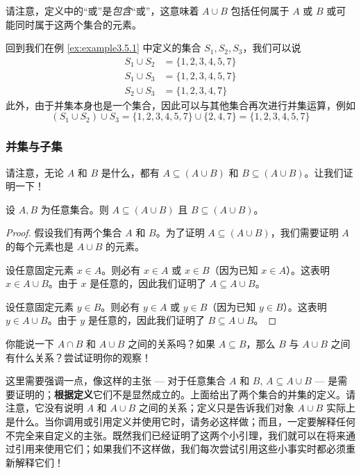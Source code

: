 请注意，定义中的``或''是\emph{包含}``或''，这意味着 $A \cup B$ 包括任何属于 $A$ 或 $B$ 或可能同时属于这两个集合的元素。\\

\begin{example}
    回到我们在例 \ref{ex:example3.5.1} 中定义的集合 $S_1, S_2, S_3$，我们可以说
    \begin{align*}
        S_1 \cup S_2 &= \{1, 2, 3, 4, 5, 7\} \\
        S_1 \cup S_3 &= \{1, 2, 3, 4, 5, 7\} \\
        S_2 \cup S_3 &= \{1, 2, 3, 4, 7\}
    \end{align*}
    此外，由于并集本身也是一个集合，因此可以与其他集合再次进行并集运算，例如
    \[(S_1 \cup S_2) \cup S_3 = \{1, 2, 3, 4, 5, 7\} \cup  \{2, 4, 7\} =  \{1, 2, 3, 4, 5, 7\}\]
\end{example}

\subsubsection*{并集与子集}

请注意，无论 $A$ 和 $B$ 是什么，都有 $A \subseteq (A \cup B)$ 和 $B \subseteq (A \cup B)$。让我们证明一下！

\begin{proposition}
    设 $A, B$ 为任意集合。则 $A \subseteq (A \cup B)$ 且 $B \subseteq (A \cup B)$。
\end{proposition}

\begin{proof}
    假设我们有两个集合 $A$ 和 $B$。为了证明 $A \subseteq (A \cup B)$，我们需要证明 $A$ 的每个元素也是 $A \cup B$ 的元素。

    设任意固定元素 $x \in A$。则必有 $x \in A$ 或 $x \in B$（因为已知 $x \in A$）。这表明 $x \in A \cup B$。由于 $x$ 是任意的，因此我们证明了 $A \subseteq A \cup B$。

    设任意固定元素 $y \in B$。则必有 $y \in A$ 或 $y \in B$（因为已知 $y \in B$）。这表明 $y \in A \cup B$。由于 $y$ 是任意的，因此我们证明了 $B \subseteq A \cup B$。
\end{proof}

你能说一下 $A \cap B$ 和 $A \cup B$ 之间的关系吗？如果 $A \subseteq B$，那么 $B$ 与 $A \cup B$ 之间有什么关系？尝试证明你的观察！

这里需要强调一点，像这样的主张 --- 对于任意集合 $A$ 和 $B$, $A \subseteq A \cup B$ --- 是需要证明的；\textbf{根据定义}它们不是显然成立的。上面给出了两个集合的并集的定义。请注意，它没有说明 $A$ 和 $A \cup B$ 之间的关系；定义只是告诉我们对象 $A \cup B$ 实际上是什么。当你调用或引用定义并使用它时，请务必这样做；而且，一定要解释任何不完全来自定义的主张。既然我们已经证明了这两个小引理，我们就可以在将来通过引用来使用它们；如果我们不这样做，我们每次尝试引用这些小事实时都必须重新解释它们！

